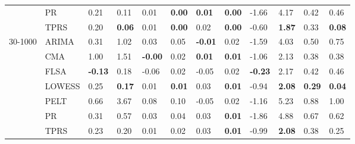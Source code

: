 \begin{table}[ht]
\begin{tabular}{llllllllllll}
   & PR & 0.21 & 0.11 & 0.01 & \textbf{0.00} & \textbf{0.01} & \textbf{0.00} & -1.66 & 4.17 & 0.42 & 0.46 \\ 
   & TPRS & 0.20 & \textbf{0.06} & 0.01 & \textbf{0.00} & 0.02 & \textbf{0.00} & -0.60 & \textbf{1.87} & 0.33 & \textbf{0.08} \\ 
  30-1000 & ARIMA & 0.31 & 1.02 & 0.03 & 0.05 & \textbf{-0.01} & 0.02 & -1.59 & 4.03 & 0.50 & 0.75 \\ 
   & CMA & 1.00 & 1.51 & \textbf{-0.00} & 0.02 & \textbf{0.01} & \textbf{0.01} & -1.06 & 2.13 & 0.38 & 0.38 \\ 
   & FLSA & \textbf{-0.13} & 0.18 & -0.06 & 0.02 & -0.05 & 0.02 & \textbf{-0.23} & 2.17 & 0.42 & 0.46 \\ 
   & LOWESS & 0.25 & \textbf{0.17} & 0.01 & \textbf{0.01} & 0.03 & \textbf{0.01} & -0.94 & \textbf{2.08} & \textbf{0.29} & \textbf{0.04} \\ 
   & PELT & 0.66 & 3.67 & 0.08 & 0.10 & -0.05 & 0.02 & -1.16 & 5.23 & 0.88 & 1.00 \\ 
   & PR & 0.31 & 0.57 & 0.03 & 0.04 & 0.03 & \textbf{0.01} & -1.86 & 4.88 & 0.67 & 0.62 \\ 
   & TPRS & 0.23 & 0.20 & 0.01 & 0.02 & 0.03 & \textbf{0.01} & -0.99 & \textbf{2.08} & 0.38 & 0.25 \\ 
   \bottomrule
\end{tabular}
\end{table}
